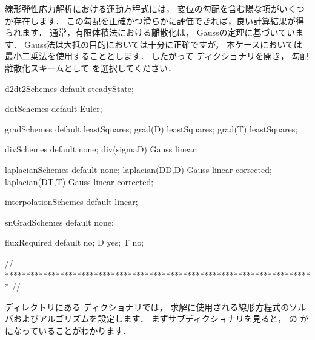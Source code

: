 線形弾性応力解析における運動方程式には，
変位の勾配を含む陽な項がいくつか存在します．
この勾配を正確かつ滑らかに評価できれば，良い計算結果が得られます．
通常，有限体積法における離散化は，
%
Gaussの定理に基づいています．
Gauss法は大抵の目的においては十分に正確ですが，
本ケースにおいては
%
%
最小二乗法を使用することとします．
したがって
%
%
ディクショナリを開き，
勾配離散化スキームとして
%
%
を選択してください．
\begin{OFverbatim}[file, linenum=17]

d2dt2Schemes
{
    default         steadyState;
}

ddtSchemes
{
    default         Euler;
}

gradSchemes
{
    default         leastSquares;
    grad(D)         leastSquares;
    grad(T)         leastSquares;
}

divSchemes
{
    default         none;
    div(sigmaD)     Gauss linear;
}

laplacianSchemes
{
    default         none;
    laplacian(DD,D) Gauss linear corrected;
    laplacian(DT,T) Gauss linear corrected;
}

interpolationSchemes
{
    default         linear;
}

snGradSchemes
{
    default         none;
}

fluxRequired
{
    default         no;
    D               yes;
    T               no;
}


// ************************************************************************* //
\end{OFverbatim}
ディレクトリにある
ディクショナリでは，
求解に使用される線形方程式のソルバおよびアルゴリズムを設定します．
まずサブディクショナリを見ると，
の
%
%
が
%
%
になっていることがわかります．
%
%
